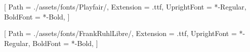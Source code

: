 [
Path = ./assets/fonts/Playfair/,
Extension = .ttf,
UprightFont = *-Regular,
BoldFont = *-Bold,
]

[
Path = ./assets/fonts/FrankRuhlLibre/,
Extension = .ttf,
UprightFont = *-Regular,
BoldFont = *-Bold,
]

\setmainfont{FrankRuhlLibre-Regular}